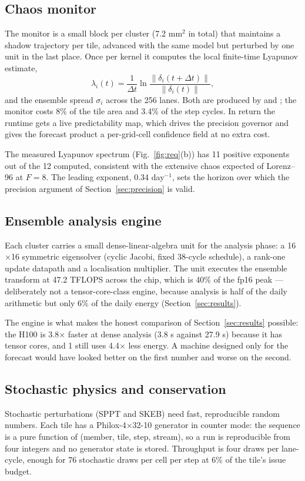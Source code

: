 \subsection{Chaos monitor}
The monitor is a small block per cluster (7.2 mm$^2$ in total) that maintains a shadow trajectory
per tile, advanced with the same model but perturbed by one unit in the last place. Once per
kernel it computes the local finite-time Lyapunov estimate,
\begin{equation}
\lambda_i(t) = \frac{1}{\Delta t}\ln\frac{\|\delta_i(t+\Delta t)\|}{\|\delta_i(t)\|},
\end{equation}
and the ensemble spread $\sigma_i$ across the 256 lanes. Both are produced by  and
; the monitor costs 8\% of the tile area and 3.4\% of the step cycles. In return
the runtime gets a live predictability map, which drives the precision governor and gives the
forecast product a per-grid-cell confidence field at no extra cost.

The measured Lyapunov spectrum (Fig.~\ref{fig:req}(b)) has 11 positive exponents out of the 12
computed, consistent with the extensive chaos expected of Lorenz--96 at $F=8$. The leading
exponent, 0.34 day$^{-1}$, sets the horizon over which the precision argument of
Section~\ref{sec:precision} is valid.

\subsection{Ensemble analysis engine}
Each cluster carries a small dense-linear-algebra unit for the analysis phase: a 16$\times$16
symmetric eigensolver (cyclic Jacobi, fixed 38-cycle schedule), a rank-one update datapath and a
localisation multiplier. The unit executes the ensemble transform at 47.2 TFLOPS across the chip,
which is 40\% of the fp16 peak --- deliberately not a tensor-core-class engine, because analysis
is half of the daily arithmetic but only 6\% of the daily energy (Section~\ref{sec:results}).

The engine is what makes the honest comparison of Section~\ref{sec:results} possible: the H100 is
3.8$\times$ faster at dense analysis (3.8 s against 27.9 s) because it has tensor cores, and
\ac{1} still uses 4.4$\times$ less energy. A machine designed only for the forecast would have
looked better on the first number and worse on the second.

\subsection{Stochastic physics and conservation}
Stochastic perturbations (SPPT and SKEB) need fast, reproducible random numbers. Each tile has a
Philox-4$\times$32-10 generator in counter mode: the sequence is a pure function of (member, tile,
step, stream), so a run is reproducible from four integers and no generator state is stored.
Throughput is four draws per lane-cycle, enough for 76 stochastic draws per cell per step at 6\%
of the tile's issue budget.

